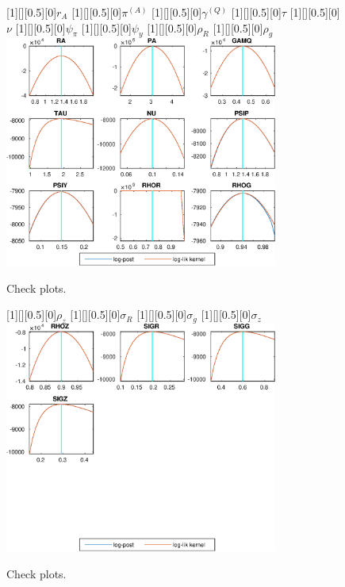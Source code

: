  
\begin{figure}[H]
[1][][0.5][0]{$ {r_{A}} $}
[1][][0.5][0]{$ {\pi^{(A)}} $}
[1][][0.5][0]{$ {\gamma^{(Q)}} $}
[1][][0.5][0]{$ {\tau} $}
[1][][0.5][0]{$ {\nu} $}
[1][][0.5][0]{$ {\psi_\pi} $}
[1][][0.5][0]{$ {\psi_y} $}
[1][][0.5][0]{$ {\rho_R} $}
[1][][0.5][0]{$ {\rho_{g}} $}
\centering 
\includegraphics[width=0.80\textwidth]{AnSchoModTheBuilder_CheckPlots1}
\caption{Check plots.}\label{Fig:CheckPlots:1}
\end{figure}
 
\begin{figure}[H]
[1][][0.5][0]{$ {\rho_z} $}
[1][][0.5][0]{$ {\sigma_R} $}
[1][][0.5][0]{$ {\sigma_{g}} $}
[1][][0.5][0]{$ {\sigma_z} $}
\centering 
\includegraphics[width=0.80\textwidth]{AnSchoModTheBuilder_CheckPlots2}
\caption{Check plots.}\label{Fig:CheckPlots:2}
\end{figure}
 
